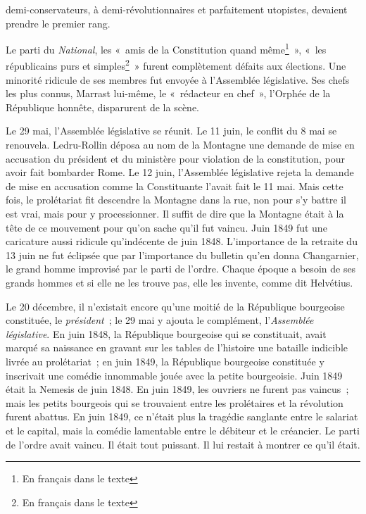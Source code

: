 \documentclass[french,twoside]{book} %
\newcommand\chapteropen{} %
\newcommand\chapterclose{} %
\begin{document}
demi-conservateurs, à demi-révolutionnaires et parfaitement utopistes, devaient prendre le premier rang.\par
Le parti du \emph{National}, les « amis de la Constitution quand même\footnote{En français dans le texte} », « les républicains purs et simples\footnote{En français dans le texte} » furent complètement défaits aux élections. Une minorité ridicule de ses membres fut envoyée à l’Assemblée législative. Ses chefs les plus connus, Marrast lui-même, le « rédacteur en chef », l’Orphée de la République honnête, disparurent de la scène.\par
Le 29 mai, l’Assemblée législative se réunit. Le 11 juin, le conflit du 8 mai se renouvela. Ledru-Rollin déposa au nom de la Montagne une demande de mise en accusation du président et du ministère pour violation de la constitution, pour avoir fait bombarder Rome. Le 12 juin, l’Assemblée législative rejeta la demande de mise en accusation comme la Constituante l’avait fait le 11 mai. Mais cette fois, le prolétariat fit descendre la Montagne dans la rue, non pour s’y battre il est vrai, mais pour y processionner. Il suffit de dire que la Montagne était à la tête de ce mouvement pour qu’on sache qu’il fut vaincu. Juin 1849 fut une caricature aussi ridicule qu’indécente de juin 1848. L’importance de la retraite du 13 juin ne fut éclipsée que par l’importance du bulletin qu’en donna Changarnier, le grand homme improvisé par le parti de l’ordre. Chaque époque a besoin de ses grands hommes et si elle ne les trouve pas, elle les invente, comme dit Helvétius.\par
Le 20 décembre, il n’existait encore qu’une moitié de la République bourgeoise constituée, le \emph{président} ; le 29 mai y ajouta le complément, l’\emph{Assemblée législative}. En juin 1848, la République bourgeoise qui se constituait, avait marqué sa naissance en gravant sur les tables de l’histoire une bataille indicible livrée au prolétariat ; en juin 1849, la République bourgeoise constituée y inscrivait une comédie innommable jouée avec la petite bourgeoisie. Juin 1849 était la Nemesis de juin 1848. En juin 1849, les ouvriers ne furent pas vaincus ; mais les petits bourgeois qui se trouvaient entre les prolétaires et la révolution furent abattus. En juin 1849, ce n’était plus la tragédie sanglante entre le salariat et le capital, mais la comédie lamentable entre le débiteur et le créancier. Le parti de l’ordre avait vaincu. Il était tout puissant. Il lui restait à montrer ce qu’il était.
\chapterclose


\chapteropen
\end{document}

